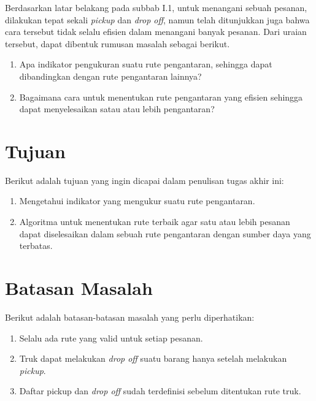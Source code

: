 Berdasarkan latar belakang pada subbab I.1, untuk menangani sebuah pesanan, dilakukan tepat 
sekali \textit{pickup} dan \textit{drop off}, namun telah ditunjukkan juga bahwa cara tersebut 
tidak selalu efisien dalam menangani banyak pesanan. 
Dari uraian tersebut, dapat dibentuk rumusan masalah sebagai berikut.

\begin{enumerate}
    \item Apa indikator pengukuran suatu rute pengantaran, sehingga dapat dibandingkan dengan rute pengantaran lainnya?
    \item Bagaimana cara untuk menentukan rute pengantaran yang efisien sehingga dapat menyelesaikan satau atau lebih pengantaran?
\end{enumerate}

\section{Tujuan}

Berikut adalah tujuan yang ingin dicapai dalam penulisan tugas akhir ini:

\begin{enumerate}
    \item Mengetahui indikator yang mengukur suatu rute pengantaran.
    \item Algoritma untuk menentukan rute terbaik agar satu atau lebih pesanan dapat diselesaikan dalam sebuah rute pengantaran dengan sumber daya yang terbatas.
\end{enumerate}

\section{Batasan Masalah}

Berikut adalah batasan-batasan masalah yang perlu diperhatikan:

\begin{enumerate}
    \item Selalu ada rute yang valid untuk setiap pesanan.
    \item Truk dapat melakukan \textit{drop off} suatu barang hanya setelah melakukan \textit{pickup}.
    \item Daftar pickup dan \textit{drop off} sudah terdefinisi sebelum ditentukan rute truk.
\end{enumerate}


